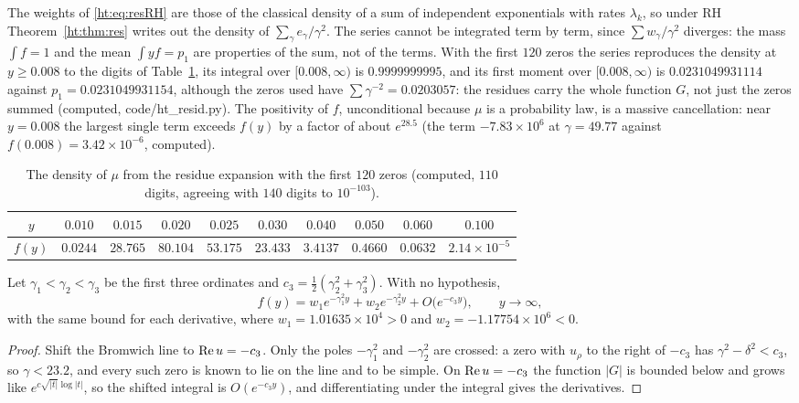 The weights of \eqref{ht:eq:resRH} are those of the classical density of a sum of independent exponentials with rates $\lambda_k$, so under RH Theorem~\ref{ht:thm:res} writes out the density of $\sum_\gamma e_\gamma/\gamma^2$. The series cannot be integrated term by term, since $\sum w_\gamma/\gamma^2$ diverges: the mass $\int f=1$ and the mean $\int yf=p_1$ are properties of the sum, not of the terms. With the first $120$ zeros the series reproduces the density at $y\ge0.008$ to the digits of Table~\ref{ht:tab:f}, its integral over $[0.008,\infty)$ is $0.9999999995$, and its first moment over $[0.008,\infty)$ is $0.0231049931114$ against $p_1=0.0231049931154$, although the zeros used have $\sum\gamma^{-2}=0.0203057$: the residues carry the whole function $G$, not just the zeros summed (computed, code/ht\_resid.py). The positivity of $f$, unconditional because $\mu$ is a probability law, is a massive cancellation: near $y=0.008$ the largest single term exceeds $f(y)$ by a factor of about $e^{28.5}$ (the term $-7.83\times10^6$ at $\gamma=49.77$ against $f(0.008)=3.42\times10^{-6}$, computed).

\begin{table}[ht]
\centering\footnotesize\setlength{\tabcolsep}{3pt}
\begin{tabular}{cccccccccc}
\toprule
$y$ & $0.010$ & $0.015$ & $0.020$ & $0.025$ & $0.030$ & $0.040$ & $0.050$ & $0.060$ & $0.100$\\
\midrule
$f(y)$ & $0.0244$ & $28.765$ & $80.104$ & $53.175$ & $23.433$ & $3.4137$ & $0.4660$ & $0.0632$ & $2.14\times10^{-5}$\\
\bottomrule
\end{tabular}
\caption{The density of $\mu$ from the residue expansion with the first $120$ zeros (computed, $110$ digits, agreeing with $140$ digits to $10^{-103}$).}\label{ht:tab:f}
\end{table}

\begin{proposition}\label{ht:prop:tail}
Let $\gamma_1<\gamma_2<\gamma_3$ be the first three ordinates and $c_3=\tfrac12(\gamma_2^2+\gamma_3^2)$. With no hypothesis,
\[
f(y)=w_1e^{-\gamma_1^2y}+w_2e^{-\gamma_2^2y}+O\big(e^{-c_3y}\big),\qquad y\to\infty,
\]
with the same bound for each derivative, where $w_1=1.01635\times10^4>0$ and $w_2=-1.17754\times10^6<0$.
\end{proposition}

\begin{proof}
Shift the Bromwich line to $\operatorname{Re} u=-c_3$. Only the poles $-\gamma_1^2$ and $-\gamma_2^2$ are crossed: a zero with $u_\rho$ to the right of $-c_3$ has $\gamma^2-\delta^2<c_3$, so $\gamma<23.2$, and every such zero is known to lie on the line and to be simple. On $\operatorname{Re} u=-c_3$ the function $|G|$ is bounded below and grows like $e^{c\sqrt{|t|}\log|t|}$, so the shifted integral is $O(e^{-c_3y})$, and differentiating under the integral gives the derivatives.
\end{proof}

